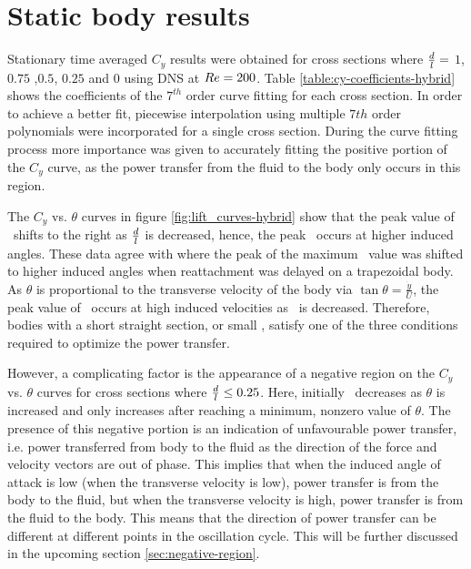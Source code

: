 \section{Static body results}
\label{sec:cross-sec-Static body results}


%

Stationary time averaged $C_y$ results were obtained for cross sections where $\frac{d}{l}=$ $1$, $0.75$ ,$0.5$, $0.25$ and $0$ using DNS at $Re=200$. Table \ref{table:cy-coefficients-hybrid} shows the coefficients of the $7^{th}$ order curve fitting for each cross section. In order to achieve a better fit, piecewise interpolation using multiple $7th$ order polynomials were incorporated for a single cross section. During the curve fitting process more importance was given to accurately fitting the positive portion of the $C_{y}$ curve, as the power transfer from the fluid to the body only occurs in this region. 

 

The $C_y$ vs. $\theta$ curves in figure \ref{fig:lift_curves-hybrid} show that the peak value of \cy\ shifts to the right as $\frac{d}{l}$ is decreased, hence, the peak \cy\ occurs at higher induced angles.  These data agree with \citet{Luo1994} where the peak of the maximum \cy\ value was shifted to higher induced angles when reattachment was delayed on a trapezoidal body. As $\theta$ is proportional to the transverse velocity of the body via $\tan{\theta}=\frac{\dot{y}}{U}$, the peak value of \cy\ occurs at high induced velocities as \ratio\ is decreased. Therefore, bodies with a short straight section, or small \ratio, satisfy one of the three conditions required to optimize the power transfer.

However, a complicating factor is the appearance of a negative region on the $C_y$ vs. $\theta$ curves for cross sections where $\frac{d}{l}\leq0.25$. Here, initially \cy\ decreases as $\theta$ is increased and only increases after reaching a minimum, nonzero value of $\theta$. The presence of this negative portion is an indication of unfavourable power transfer, i.e. power transferred from body to the fluid as the direction of the force and velocity vectors are out of phase. This implies that when the induced angle of attack is low (when the transverse velocity is low), power transfer is from the body to the fluid, but when the transverse velocity is high, power transfer is from the fluid to the body. This means that the direction of power transfer can be different at different points in the oscillation cycle. This will be further discussed in the upcoming section \ref{sec:negative-region}.

